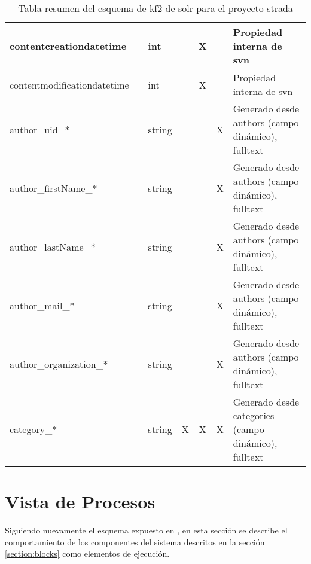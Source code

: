 \begin{center}
\begin {table}[H]
\begin{tabular}{| l | c | l | c | c | c | p{5cm} |}
 contentcreationdatetime & & int & & X &  & Propiedad interna de \gls{svn} \\ \hline
 contentmodificationdatetime & & int & & X &  & Propiedad interna de \gls{svn} \\ \hline
 author\_uid\_* & & string & & & X & Generado desde authors (campo dinámico), \Gls{fulltext} \\ \hline
 author\_firstName\_* & & string & & & X & Generado desde authors (campo dinámico), \Gls{fulltext} \\ \hline
 author\_lastName\_* & & string & & & X & Generado desde authors (campo dinámico), \Gls{fulltext} \\ \hline
 author\_mail\_* & & string & & & X & Generado desde authors (campo dinámico), \Gls{fulltext} \\ \hline
 author\_organization\_* & & string & & & X & Generado desde authors (campo dinámico), \Gls{fulltext} \\ \hline
  category\_* & & string & X & X & X & Generado desde categories (campo dinámico), \Gls{fulltext} \\ \hline
    \end{tabular}
    \caption{Tabla resumen del esquema de \gls{kf2} de \gls{solr} para el proyecto \gls{strada}}
    \label{table:index}
  \end{table}
\end{center}

\begin{comment}

\section{\IfLanguageName{english}{Detailed Component Design}{Diseño detallado de Componentes}}
Para cada uno de los módulos funcionales del sistema debemos realizar un diagrama de secuencia, para definir la interacción existente entre las clases de objetos que permitan responder a eventos externos.
\end{comment}

\section{Vista de Procesos}
Siguiendo nuevamente el esquema expuesto  en \cite{arc42}, en esta sección se describe el comportamiento de los componentes del sistema descritos en la sección \ref{section:blocks} como elementos de ejecución.\\

